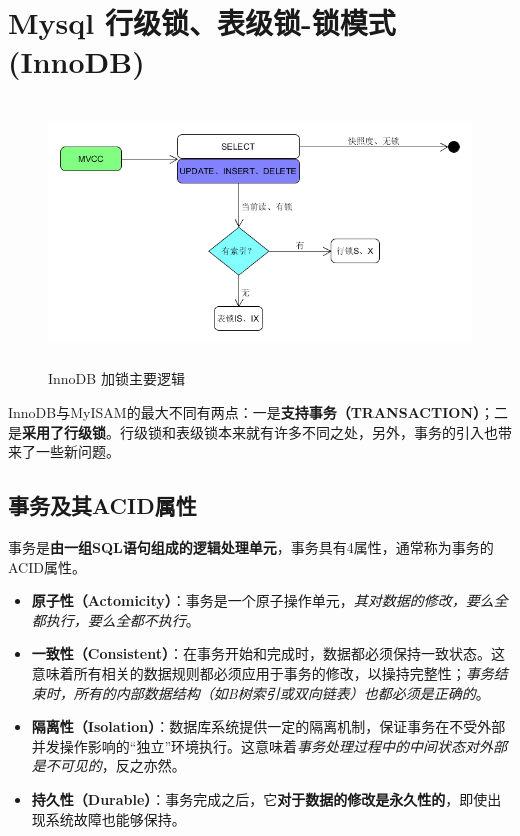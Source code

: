 \documentclass[UTF8,a4paper,12pt]{ctexbook}
\begin{document}
		
	\section{Mysql 行级锁、表级锁-锁模式(InnoDB)}
		\begin{figure}[H]
			\centering
			\includegraphics[width=15cm,height=7cm]{Index2}
			\caption{InnoDB 加锁主要逻辑}
		\end{figure}
	
		InnoDB与MyISAM的最大不同有两点：一是\textbf{支持事务（TRANSACTION）}；二是\textbf{采用了行级锁}。行级锁和表级锁本来就有许多不同之处，另外，事务的引入也带来了一些新问题。
		
		\subsection{事务及其ACID属性}
			事务是\textbf{由一组SQL语句组成的逻辑处理单元}，事务具有4属性，通常称为事务的ACID属性。
			
			\begin{itemize}
				\item \textbf{原子性（Actomicity）}：事务是一个原子操作单元，\textit{其对数据的修改，要么全都执行，要么全都不执行}。
				\item \textbf{一致性（Consistent）}：在事务开始和完成时，数据都必须保持一致状态。这意味着所有相关的数据规则都必须应用于事务的修改，以操持完整性；\textit{事务结束时，所有的内部数据结构（如B树索引或双向链表）也都必须是正确的}。
				\item \textbf{隔离性（Isolation）}：数据库系统提供一定的隔离机制，保证事务在不受外部并发操作影响的“独立”环境执行。这意味着\textit{事务处理过程中的中间状态对外部是不可见的}，反之亦然。
				\item \textbf{持久性（Durable）}：事务完成之后，它\textbf{对于数据的修改是永久性的}，即使出现系统故障也能够保持。
			\end{itemize}
		
\end{document}
